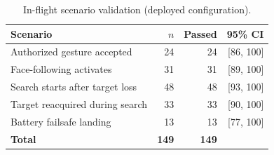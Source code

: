 \begin{table}[t]
\caption{In-flight scenario validation (deployed configuration).}
\label{tab:flight}
\centering
\footnotesize
\setlength{\tabcolsep}{4pt}
\renewcommand{\arraystretch}{1.02}
\begin{tabular}{@{}lrrr@{}}
\toprule
Scenario & $n$ & Passed & 95\% CI \\
\midrule
Authorized gesture accepted & 24 & 24 & [86, 100] \\
Face-following activates & 31 & 31 & [89, 100] \\
Search starts after target loss & 48 & 48 & [93, 100] \\
Target reacquired during search & 33 & 33 & [90, 100] \\
Battery failsafe landing & 13 & 13 & [77, 100] \\
\midrule
\textbf{Total} & \textbf{149} & \textbf{149} & \\
\bottomrule
\end{tabular}
\end{table}
